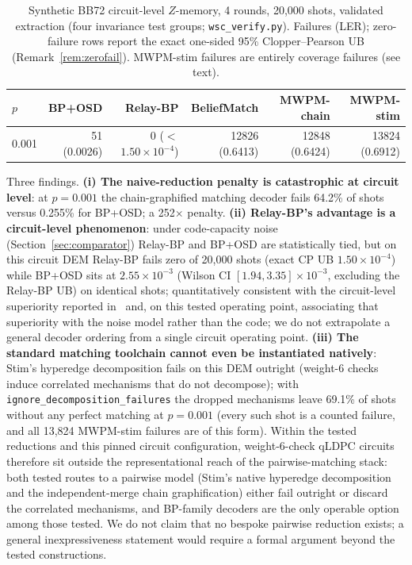 \documentclass[pdflatex,sn-mathphys-num]{sn-jnl}
\theoremstyle{thmstyleone}
\theoremstyle{thmstyletwo}
\theoremstyle{thmstylethree}
\begin{document}
\begin{table}[htbp]\centering\small
\caption{Synthetic BB72 circuit-level $Z$-memory, 4 rounds, 20{,}000 shots, validated extraction (four invariance test groups; \texttt{wsc\_verify.py}). Failures (LER); zero-failure rows report the exact one-sided 95\% Clopper--Pearson UB (Remark~\ref{rem:zerofail}). MWPM-stim failures are entirely coverage failures (see text).}
\label{tab:wsc}
\begin{tabular}{@{}lrrrrr@{}}
\toprule
$p$ & BP+OSD & Relay-BP & BeliefMatch & MWPM-chain & MWPM-stim \\
\midrule
0.001 & 51 (0.0026) & 0 ($<$$1.50\!\times\!10^{-4}$) & 12826 (0.6413) & 12848 (0.6424) & 13824 (0.6912) \\
\bottomrule
\end{tabular}
\end{table}

Three findings. \textbf{(i) The naive-reduction penalty is catastrophic at circuit level}: at $p=0.001$ the chain-graphified matching decoder fails 64.2\% of shots versus 0.255\% for BP+OSD; a 252$\times$ penalty. \textbf{(ii) Relay-BP's advantage is a circuit-level phenomenon}: under code-capacity noise (Section~\ref{sec:comparator}) Relay-BP and BP+OSD are statistically tied, but on this circuit DEM Relay-BP fails zero of 20{,}000 shots (exact CP UB $1.50\times10^{-4}$) while BP+OSD sits at $2.55\times10^{-3}$ (Wilson CI $[1.94,3.35]\times10^{-3}$, excluding the Relay-BP UB) on identical shots; quantitatively consistent with the circuit-level superiority reported in~\cite{Muller2025relay} and, on this tested operating point, associating that superiority with the noise model rather than the code; we do not extrapolate a general decoder ordering from a single circuit operating point. \textbf{(iii) The standard matching toolchain cannot even be instantiated natively}: Stim's hyperedge decomposition fails on this DEM outright (weight-6 checks induce correlated mechanisms that do not decompose); with \texttt{ignore\_decomposition\_failures} the dropped mechanisms leave 69.1\% of shots without any perfect matching at $p=0.001$ (every such shot is a counted failure, and all 13{,}824 MWPM-stim failures are of this form). Within the tested reductions and this pinned circuit configuration, weight-6-check qLDPC circuits therefore sit outside the representational reach of the pairwise-matching stack: both tested routes to a pairwise model (Stim's native hyperedge decomposition and the independent-merge chain graphification) either fail outright or discard the correlated mechanisms, and BP-family decoders are the only operable option among those tested. We do not claim that no bespoke pairwise reduction exists; a general inexpressiveness statement would require a formal argument beyond the tested constructions.
\end{document}
